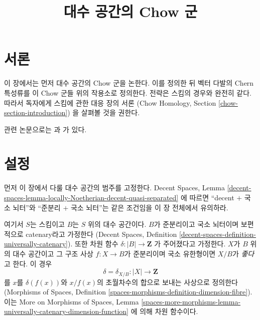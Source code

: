 

%


\title{대수 공간의 Chow 군}

\maketitle

\label{section-phantom}


\tableofcontents


\section{서론}
\label{section-introduction}

\noindent
이 장에서는 먼저 대수 공간의 Chow 군을 논한다.
이를 정의한 뒤 벡터 다발의 Chern 특성류를 이 Chow 군들 위의
작용소로 정의한다. 전략은 스킴의 경우와 완전히 같다. 따라서 독자에게
스킴에 관한 대응 장의 서론
(Chow Homology, Section \ref{chow-section-introduction})
을 살펴볼 것을 권한다.

\medskip\noindent
관련 논문으로는 \cite{edidin-graham}과 \cite{kresch_cycle}가 있다.



\section{설정}
\label{section-setup}

\noindent
먼저 이 장에서 다룰 대수 공간의 범주를 고정한다.
Decent Spaces, Lemma
\ref{decent-spaces-lemma-locally-Noetherian-decent-quasi-separated}
에 따르면 ``decent $+$ 국소 뇌터''와
``준분리 $+$ 국소 뇌터''는 같은 조건임을 이 장 전체에서 유의하라.

\begin{situation}
\label{situation-setup}
여기서 $S$는 스킴이고 $B$는 $S$ 위의 대수 공간이다.
$B$가 준분리이고 국소 뇌터이며 보편적으로 catenary라고 가정한다
(Decent Spaces, Definition
\ref{decent-spaces-definition-universally-catenary}).
또한 차원 함수
$\delta : |B| \longrightarrow \mathbf{Z}$
가 주어졌다고 가정한다. $X$가 $B$ 위의 대수 공간이고 그 구조 사상
$f : X \to B$가 준분리이며 국소 유한형이면 $X/B$가
{\it 좋다}고 한다. 이 경우
$$
\delta = \delta_{X/B} : |X| \longrightarrow \mathbf{Z}
$$
를 $x$를 $\delta(f(x))$와 $x/f(x)$의 초월차수의 합으로 보내는 사상으로
정의한다(Morphisms of Spaces, Definition
\ref{spaces-morphisms-definition-dimension-fibre}).
이는 More on Morphisms of Spaces, Lemma
\ref{spaces-more-morphisms-lemma-universally-catenary-dimension-function}
에 의해 차원 함수이다.
\end{situation}

